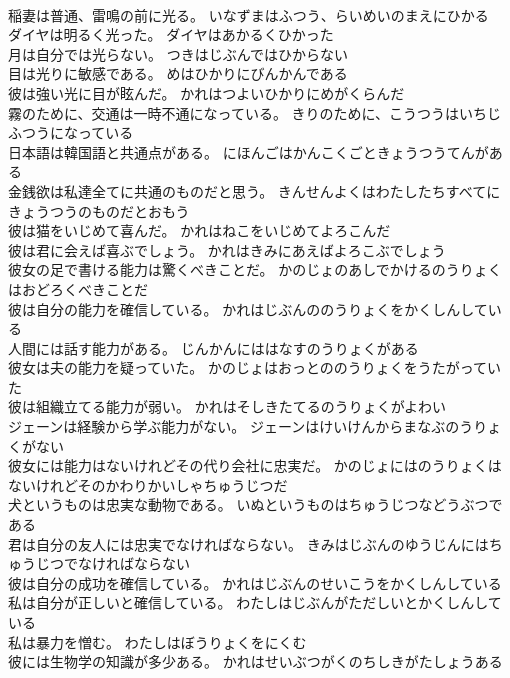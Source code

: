 \documentclass[8pt]{extreport}
\begin{document}
\begin{CJK}{UTF8}{min}
\\	稲妻は普通、雷鳴の前に光る。	いなずまはふつう、らいめいのまえにひかる 
\\	ダイヤは明るく光った。	ダイヤはあかるくひかった 
\\	月は自分では光らない。	つきはじぶんではひからない 
\\	目は光りに敏感である。	めはひかりにびんかんである 
\\	彼は強い光に目が眩んだ。	かれはつよいひかりにめがくらんだ 
\\	霧のために、交通は一時不通になっている。	きりのために、こうつうはいちじふつうになっている 
\\	日本語は韓国語と共通点がある。	にほんごはかんこくごときょうつうてんがある 
\\	金銭欲は私達全てに共通のものだと思う。	きんせんよくはわたしたちすべてにきょうつうのものだとおもう 
\\	彼は猫をいじめて喜んだ。	かれはねこをいじめてよろこんだ 
\\	彼は君に会えば喜ぶでしょう。	かれはきみにあえばよろこぶでしょう 
\\	彼女の足で書ける能力は驚くべきことだ。	かのじょのあしでかけるのうりょくはおどろくべきことだ 
\\	彼は自分の能力を確信している。	かれはじぶんののうりょくをかくしんしている 
\\	人間には話す能力がある。	じんかんにははなすのうりょくがある 
\\	彼女は夫の能力を疑っていた。	かのじょはおっとののうりょくをうたがっていた 
\\	彼は組織立てる能力が弱い。	かれはそしきたてるのうりょくがよわい 
\\	ジェーンは経験から学ぶ能力がない。	ジェーンはけいけんからまなぶのうりょくがない 
\\	彼女には能力はないけれどその代り会社に忠実だ。	かのじょにはのうりょくはないけれどそのかわりかいしゃちゅうじつだ 
\\	犬というものは忠実な動物である。	いぬというものはちゅうじつなどうぶつである 
\\	君は自分の友人には忠実でなければならない。	きみはじぶんのゆうじんにはちゅうじつでなければならない 
\\	彼は自分の成功を確信している。	かれはじぶんのせいこうをかくしんしている 
\\	私は自分が正しいと確信している。	わたしはじぶんがただしいとかくしんしている 
\\	私は暴力を憎む。	わたしはぼうりょくをにくむ 
\\	彼には生物学の知識が多少ある。	かれはせいぶつがくのちしきがたしょうある 

\end{CJK}
\end{document}
